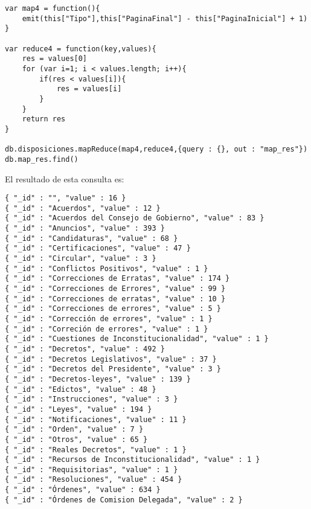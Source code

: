 \begin{verbatim}
var map4 = function(){
    emit(this["Tipo"],this["PaginaFinal"] - this["PaginaInicial"] + 1)
}

var reduce4 = function(key,values){
    res = values[0]
    for (var i=1; i < values.length; i++){
        if(res < values[i]){
            res = values[i]
        }
    }
    return res
}

db.disposiciones.mapReduce(map4,reduce4,{query : {}, out : "map_res"})
db.map_res.find()
\end{verbatim}

El resultado de esta consulta es:

\begin{verbatim}
{ "_id" : "", "value" : 16 }
{ "_id" : "Acuerdos", "value" : 12 }
{ "_id" : "Acuerdos del Consejo de Gobierno", "value" : 83 }
{ "_id" : "Anuncios", "value" : 393 }
{ "_id" : "Candidaturas", "value" : 68 }
{ "_id" : "Certificaciones", "value" : 47 }
{ "_id" : "Circular", "value" : 3 }
{ "_id" : "Conflictos Positivos", "value" : 1 }
{ "_id" : "Correcciones de Erratas", "value" : 174 }
{ "_id" : "Correcciones de Errores", "value" : 99 }
{ "_id" : "Correcciones de erratas", "value" : 10 }
{ "_id" : "Correcciones de errores", "value" : 5 }
{ "_id" : "Corrección de errores", "value" : 1 }
{ "_id" : "Correción de errores", "value" : 1 }
{ "_id" : "Cuestiones de Inconstitucionalidad", "value" : 1 }
{ "_id" : "Decretos", "value" : 492 }
{ "_id" : "Decretos Legislativos", "value" : 37 }
{ "_id" : "Decretos del Presidente", "value" : 3 }
{ "_id" : "Decretos-leyes", "value" : 139 }
{ "_id" : "Edictos", "value" : 48 }
{ "_id" : "Instrucciones", "value" : 3 }
{ "_id" : "Leyes", "value" : 194 }
{ "_id" : "Notificaciones", "value" : 11 }
{ "_id" : "Orden", "value" : 7 }
{ "_id" : "Otros", "value" : 65 }
{ "_id" : "Reales Decretos", "value" : 1 }
{ "_id" : "Recursos de Inconstitucionalidad", "value" : 1 }
{ "_id" : "Requisitorias", "value" : 1 }
{ "_id" : "Resoluciones", "value" : 454 }
{ "_id" : "Órdenes", "value" : 634 }
{ "_id" : "Órdenes de Comision Delegada", "value" : 2 }
\end{verbatim}
